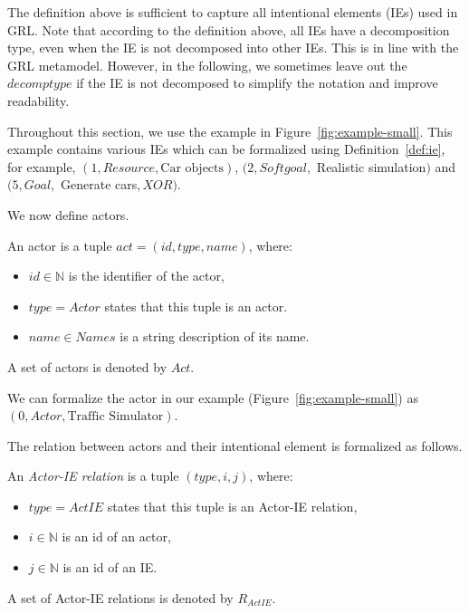 The definition above is sufficient to capture all intentional elements (IEs) used in GRL. Note that according to the definition above, all IEs have a decomposition type, even when the IE is not decomposed into other IEs. This is in line with the GRL metamodel. However, in the following, we sometimes leave out the $decomptype$ if the IE is not decomposed to simplify the notation and improve readability.

Throughout this section, we use the example in Figure~\ref{fig:example-small}. This example contains various IEs which can be formalized using Definition~\ref{def:ie}, for example, 
$(1, Resource, \text{Car objects})$, $(2, Softgoal,$ Realistic simulation$)$ and $(5, Goal,$ Generate cars$, XOR)$.

We now define actors.

\begin{definition}[Actor]
\label{def:actor}
An actor is a tuple $act=(id,type, name)$, where:
\begin{itemize}
\item $id\in\mathbb{N}$ is the identifier of the actor, 
\item $type = Actor$ states that this tuple is an actor.
\item $name\in Names$ is a string description of its name.
\end{itemize}
A set of actors is denoted by $Act$.
\end{definition}
We can formalize the actor in our example (Figure~\ref{fig:example-small}) as $(0,Actor,\text{Traffic Simulator})$.%

The relation between actors and their intentional element is formalized as follows. 

\begin{definition}
\label{def:act-ie-relation}
An \emph{Actor-IE relation} is a tuple $(type, i, j)$, where:
\begin{itemize}
\item $type = ActIE$ states that this tuple is an Actor-IE relation,
\item $i\in\mathbb{N}$ is an id of an actor,
\item $j\in\mathbb{N}$ is an id of an IE.
\end{itemize}

A set of Actor-IE relations is denoted by $R_{ActIE}$.
\end{definition}

